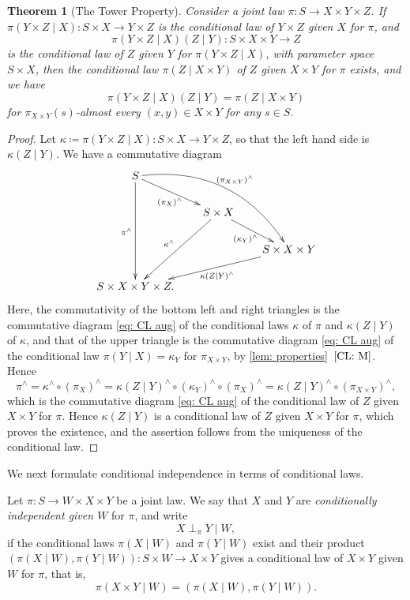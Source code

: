 \documentclass[12pt,reqno]{amsart}%
\theoremstyle{plain}
\newtheorem{theorem}{Theorem}[section]
\theoremstyle{definition}
\begin{document}
\begin{theorem}[The Tower Property]\label{thm: tower}
	Consider a joint law $\pi\colon S\rightarrow X\times Y\times Z$.
	If $\pi(Y\times Z\mid X)\colon S\times X\rightarrow Y\times Z$ is the
	conditional law of $Y\times Z$ given $X$ for $\pi$, and
	\[
		\pi(Y\times Z\mid X)(Z\mid Y)\colon S\times X\times Y\rightarrow Z
	\]
	is the conditional law of $Z$
	given $Y$ for $\pi(Y\times Z\mid X)$, with parameter space $S\times X$,
	then the conditional law $\pi(Z\mid X\times Y)$ of $Z$ given $X\times Y$ for $\pi$ exists, and
	we have
	\[
		\pi(Y\times Z\mid X)(Z\mid Y)=\pi(Z\mid X\times Y)
	\]
	for $\pi_{X\times Y}(s)$-almost every $(x,y)\in X\times Y$ for any $s\in S$.
\end{theorem}


\begin{proof}
	Let $\kappa\coloneqq\pi(Y\times Z\mid X)\colon S\times X\rightarrow Y\times Z$, so that the left hand side is
	$\kappa(Z\mid Y)$.
	We have a commutative diagram
	\[
		\xymatrix@C=20pt@R=20pt{
			  S\ar[ddd]_{\pi^\wedge} \ar[dr]_{(\pi_X)^\wedge} \ar@/^6ex/[ddrr]^{(\pi_{X\times Y})^\wedge} &  &\\
			  &    S\times X\ar[ddl]_{\kappa^\wedge}  \ar[dr]_{(\kappa_Y)^\wedge}&   \\
			 &  & S\times X \times Y\ar[lld]^{\kappa(Z\mid Y)^\wedge}\\
			  S\times X\times Y \times Z. &  &
		}
	\]
	Here, the commutativity of the bottom left and right triangles is the commutative diagram
	\eqref{eq: CL aug} of the conditional laws $\kappa$ of $\pi$ and $\kappa(Z\mid Y)$ of $\kappa$,
	and that of the upper triangle is the commutative diagram \eqref{eq: CL aug} of the conditional law
	$\pi(Y\mid X)=\kappa_Y$ for $\pi_{X\times Y}$, by \cref{lem: properties}~$\ref{CL: M}$.
	Hence
	\[
		\pi^\wedge=\kappa^\wedge\circ(\pi_X)^\wedge=\kappa(Z\mid Y)^\wedge\circ(\kappa_Y)^\wedge\circ(\pi_X)^\wedge
		=\kappa(Z\mid Y)^\wedge\circ(\pi_{X\times Y})^\wedge,
	\]
	which is the commutative diagram \eqref{eq: CL aug} of the conditional law of $Z$ given $X\times Y$ for $\pi$.
	Hence $\kappa(Z\mid Y)$ is a conditional law of $Z$ given $X\times Y$ for $\pi$, which proves the existence,
	and the assertion follows from the uniqueness of the conditional law.
\end{proof}

We next formulate conditional independence in terms of conditional laws.

\begin{definition}\label{def: CI}
	Let $\pi\colon S\rightarrow W\times X\times Y$ be a joint law.
	We say that $X$ and $Y$ are \emph{conditionally independent given $W$} for $\pi$, and write
	\[
		X\perp_\pi Y\mid W,
	\]
	if the conditional laws $\pi(X\mid W)$ and $\pi(Y\mid W)$ exist and their product
	$(\pi(X\mid W),\pi(Y\mid W))\colon S\times W\rightarrow X\times Y$
	gives a conditional law of $X\times Y$ given $W$ for $\pi$, that is,
	\[
		\pi(X\times Y\mid W)=(\pi(X\mid W),\pi(Y\mid W)).
	\]
\end{definition}
\end{document}

